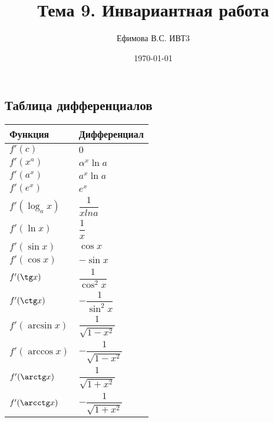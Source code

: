 \documentclass[a4paper,12pt]{article} %
\author{Ефимова В.С. ИВТ3}
\title{Тема 9. Инвариантная работа}
\date{\today}
\begin{document}
\maketitle
\newpage
\begin{center}
\section*{Таблица дифференциалов}
\begin{table}[h]
\begin{tabular}{|p{200pt}|p{200pt}|}
\hline
Функция & Дифференциал \\
\hline
$f'(c)$ & $0$ \\
\hline
$f'(x^{a})$ & $\alpha^{x}\ln a$ \\
\hline
$f'(a^{x})$ & $a^{x}\ln a$ \\
\hline
$f'(e^{x})$ & $e^{x}$ \\
\hline
$f'(\log_{a}x)$ & $\dfrac{1}{x ln a}$ \\
\hline
$f'(\ln x)$ & $\dfrac{1}{x}$ \\
\hline
$f'(\sin x)$ & $\cos x$ \\
\hline
$f'(\cos x)$ & $-\sin x$ \\
\hline
$f'(\tg x)$ & $\dfrac{1}{\cos^{2}x}$ \\
\hline
$f'(\ctg x)$ & $-\dfrac{1}{\sin^{2}x}$ \\
\hline
$f'(\arcsin x)$ & $\dfrac{1}{\sqrt{1-x^{2}}}$ \\
\hline
$f'(\arccos x)$ & $-\dfrac{1}{\sqrt{1-x^{2}}}$ \\
\hline
$f'(\arctg x)$ & $\dfrac{1}{\sqrt{1+x^{2}}}$ \\
\hline
$f'(\arcctg x)$ & $-\dfrac{1}{\sqrt{1+x^{2}}}$ \\
\hline
\end{tabular} 
\end{table}


\end{center}
\end{document}
